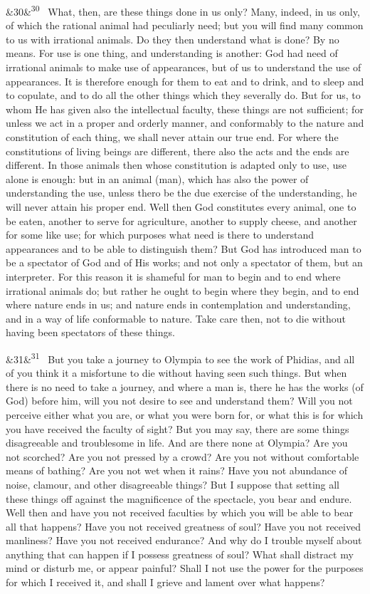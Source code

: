 \documentclass[12pt]{article}
\newcommand{\para}[1][]{\par\noindent\ifx&#1&\else\textsuperscript{\footnotesize #1}~\fi}
\begin{document}
\para[30] What, then, are these things done in us only? Many, indeed, in us only, of which the rational animal had peculiarly need; but you will find many common to us with irrational animals. Do they then understand what is done? By no means. For use is one thing, and understanding is another: God had need of irrational animals to make use of appearances, but of us to understand the use of appearances. It is therefore enough for them to eat and to drink, and to sleep and to copulate, and to do all the other things which they severally do. But for us, to whom He has given also the intellectual faculty, these things are not sufficient; for unless we act in a proper and orderly manner, and conformably to the nature and constitution of each thing, we shall never attain our true end. For where the constitutions of living beings are different, there also the acts and the ends are different. In those animals then whose constitution is adapted only to use, use alone is enough: but in an animal (man), which has also the power of understanding the use, unless thero be the due exercise of the understanding, he will never attain his proper end. Well then God constitutes every animal, one to be eaten, another to serve for agriculture, another to supply cheese, and another for some like use; for which purposes what need is there to understand appearances and to be able to distinguish them? But God has introduced man to be a spectator of God and of His works; and not only a spectator of them, but an interpreter. For this reason it is shameful for man to begin and to end where irrational animals do; but rather he ought to begin where they begin, and to end where nature ends in us; and nature ends in contemplation and understanding, and in a way of life conformable to nature. Take care then, not to die without having been spectators of these things.

\para[31] But you take a journey to Olympia to see the work of Phidias, and all of you think it a misfortune to die without having seen such things. But when there is no need to take a journey, and where a man is, there he has the works (of God) before him, will you not desire to see and understand them? Will you not perceive either what you are, or what you were born for, or what this is for which you have received the faculty of sight? But you may say, there are some things disagreeable and troublesome in life. And are there none at Olympia? Are you not scorched? Are you not pressed by a crowd? Are you not without comfortable means of bathing? Are you not wet when it rains? Have you not abundance of noise, clamour, and other disagreeable things? But I suppose that setting all these things off against the magnificence of the spectacle, you bear and endure. Well then and have you not received faculties by which you will be able to bear all that happens? Have you not received greatness of soul? Have you not received manliness? Have you not received endurance? And why do I trouble myself about anything that can happen if I possess greatness of soul? What shall distract my mind or disturb me, or appear painful? Shall I not use the power for the purposes for which I received it, and shall I grieve and lament over what happens?
\end{document}
